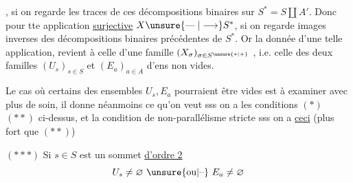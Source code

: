, si on regarde les traces de ces décompositions binaires sur $S^\ast=S\amalg A'$. Donc pour tte application \uline{surjective} $X\unsure{\mathrel{\text{---}}|\longrightarrow}S^\ast$, si on regarde  images inverses des décompositions binaires précédentes de $S^\ast$. Or la donnée d'une telle application, revient à celle d'une famille $(X_\sigma)_{\sigma\in S^{\unsure{\ast|+}}}$ , i.e.  celle des deux familles $(U_s)_{s\in S}$ et $(E_a)_{a\in A}$ d'ens non vides.

Le cas où certains des ensembles $U_s,E_a$ pourraient être vides est à examiner avec plus de soin, il donne néanmoins ce qu'on veut sss on a les conditions $(\ast)$ $(\ast\ast)$ ci-dessus, et la condition de non-parallélisme stricte sss on a \uline{ceci} (plus fort que $(\ast\ast)$)

$(\ast\ast\ast)$ Si $s\in S$ est un sommet \uline{d'ordre 2}    
\[
U_s\ne\varnothing\ \unsure{\text{ou}|\text{--}}\ E_a\ne\varnothing
\]
